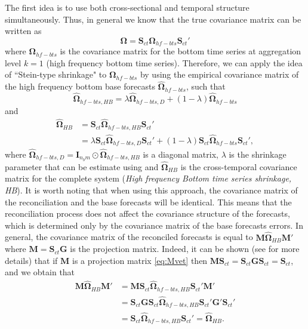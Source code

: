 \documentclass[a4paper,11pt]{article}
\newcommand{\Gvet}{\bm{G}}
\newcommand{\Ivet}{\bm{I}}
\newcommand{\Mvet}{\bm{M}}
\newcommand{\Svet}{\bm{S}}
\newcommand{\Omegavet}{\bm{\Omega}}
\theoremstyle{definition}
\begin{document}
The first idea is to use both cross-sectional and temporal structure simultaneously. Thus, in general we know that the true covariance matrix can be written as
\begin{equation}
	\label{eq:OmSct}
	\Omegavet= \Svet_{ct}\Omegavet_{hf-bts}\Svet_{ct}'
\end{equation}
where $\Omegavet_{hf-bts}$ is the covariance matrix for the bottom time series at aggregation level $k = 1$ (high frequency bottom time series).
Therefore, we can apply the idea of “Stein-type shrinkage" to $\Omegavet_{hf-bts}$ by using the empirical covariance matrix of the high frequency bottom base forecasts $\widehat{\Omegavet}_{hf-bts}$, such that
$$
	\widehat{\Omegavet}_{hf-bts, HB} = \lambda \widehat{\Omegavet}_{hf-bts, D} + (1-\lambda) \widehat{\Omegavet}_{hf-bts}
$$
and
\begin{align*}
	\widehat{\Omegavet}_{HB} & = \Svet_{ct}\widehat{\Omegavet}_{hf-bts, HB}\Svet_{ct}'                                                                        \\
	                         & = \lambda \Svet_{ct}\widehat{\Omegavet}_{hf-bts, D}\Svet_{ct}'+ (1-\lambda) \Svet_{ct}\widehat{\Omegavet}_{hf-bts}\Svet_{ct}',
\end{align*}
where $\widehat{\Omegavet}_{hf-bts, D} = \Ivet_{n_b m}\odot\widehat{\Omegavet}_{hf-bts, HB}$ is a diagonal matrix, $\lambda$ is the shrinkage parameter that can be estimate using \cite{schafer2005} and $\widehat{\Omegavet}_{HB}$ is the cross-temporal covariance matrix for the complete system (\textit{High frequency Bottom time series shrinkage, HB}).
It is worth noting that when using this approach, the covariance matrix of the reconciliation and the base forecasts will be identical. This means that the reconciliation process does not affect the covariance structure of the forecasts, which is determined only by the covariance matrix of the base forecasts errors. In general, the covariance matrix of the reconciled forecasts is equal to $\Mvet \widehat{\Omegavet}_{HB} \Mvet'$ where $\Mvet = \Svet_{ct}\Gvet$ is the projection matrix. Indeed, it can be shown (see \citealp{panagiotelis2021} for more details) that if $\Mvet$ is a projection matrix \eqref{eq:Mvet} then $\Mvet\Svet_{ct} = \Svet_{ct}\Gvet\Svet_{ct} = \Svet_{ct}$, and we obtain that
$$
	\begin{aligned}
		\Mvet \widehat{\Omegavet}_{HB} \Mvet' & = \Mvet\Svet_{ct}\widehat{\Omegavet}_{hf-bts, HB}\Svet_{ct}'\Mvet'                      \\
		                                      & = \Svet_{ct}\Gvet\Svet_{ct}\widehat{\Omegavet}_{hf-bts, HB}\Svet_{ct}'\Gvet'\Svet_{ct}' \\
		                                      & = \Svet_{ct}\widehat{\Omegavet}_{hf-bts, HB}\Svet_{ct}' = \widehat{\Omegavet}_{HB}.
	\end{aligned}
$$
\end{document}
